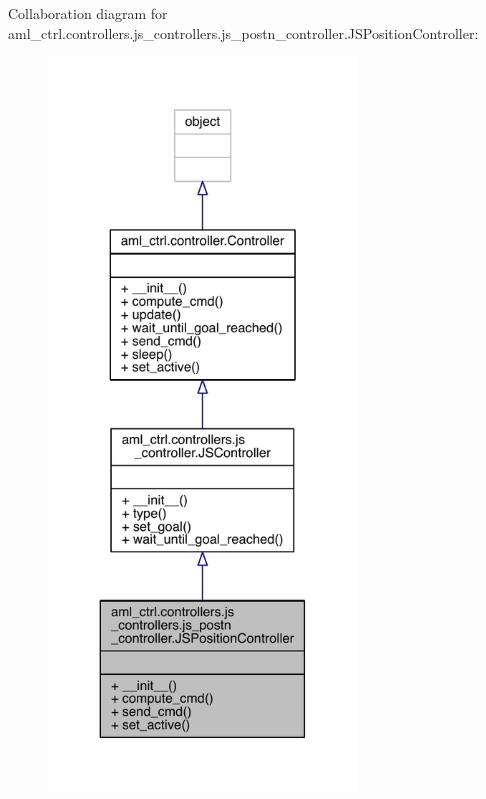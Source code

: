 Collaboration diagram for aml\+\_\+ctrl.\+controllers.\+js\+\_\+controllers.\+js\+\_\+postn\+\_\+controller.\+J\+S\+Position\+Controller\+:\nopagebreak
\begin{figure}[H]
\begin{center}
\leavevmode
\includegraphics[height=550pt]{classaml__ctrl_1_1controllers_1_1js__controllers_1_1js__postn__controller_1_1_j_s_position_controller__coll__graph}
\end{center}
\end{figure}
